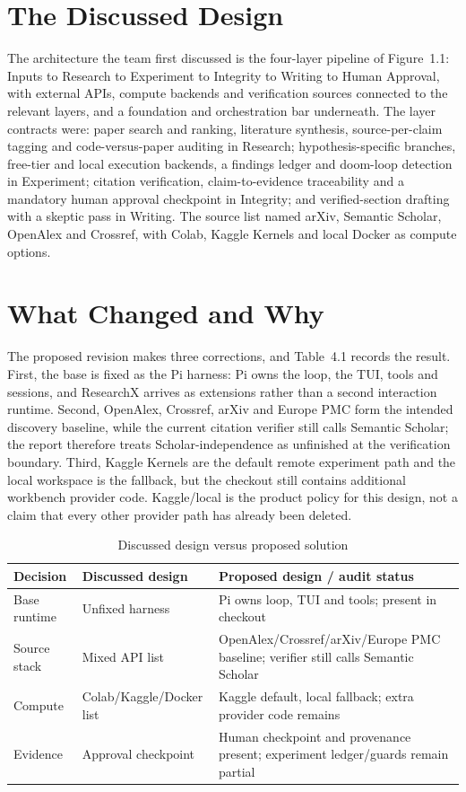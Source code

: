 \documentclass[12pt,a4paper]{report}
\numberwithin{equation}{chapter}
\begin{document}
\section{The Discussed Design}
The architecture the team first discussed is the four-layer pipeline of
Figure~1.1: Inputs to Research to Experiment to Integrity to Writing to
Human Approval, with external APIs, compute backends and verification
sources connected to the relevant layers, and a foundation and
orchestration bar underneath. The layer contracts were: paper
search and ranking, literature synthesis, source-per-claim tagging and
code-versus-paper auditing in Research; hypothesis-specific branches,
free-tier and local execution backends, a findings ledger and doom-loop
detection in Experiment; citation verification, claim-to-evidence
traceability and a mandatory human approval checkpoint in Integrity; and
verified-section drafting with a skeptic pass in Writing. The source list
named arXiv, Semantic Scholar, OpenAlex and Crossref, with Colab, Kaggle
Kernels and local Docker as compute options.

\section{What Changed and Why}
The proposed revision makes three corrections, and Table~4.1 records the
result. First, the base is fixed as the Pi harness: Pi owns the loop, the TUI,
tools and sessions, and ResearchX arrives as extensions rather than a second
interaction runtime. Second, OpenAlex, Crossref, arXiv and Europe PMC form
the intended discovery baseline, while the current citation verifier still
calls Semantic Scholar; the report therefore treats Scholar-independence as
unfinished at the verification boundary. Third, Kaggle Kernels are the default
remote experiment path and the local workspace is the fallback, but the
checkout still contains additional workbench provider code. Kaggle/local is
the product policy for this design, not a claim that every other provider path
has already been deleted.

\begin{table}[ht]
\centering
\caption{Discussed design versus proposed solution}
\begin{tabular}{@{}L{2.4cm}L{4.4cm}L{6.0cm}@{}}
\toprule
Decision & Discussed design & Proposed design / audit status \\
\midrule
Base runtime & Unfixed harness & Pi owns loop, TUI and tools; present in checkout \\
Source stack & Mixed API list & OpenAlex/Crossref/arXiv/Europe PMC baseline; verifier still calls Semantic Scholar \\
Compute & Colab/Kaggle/Docker list & Kaggle default, local fallback; extra provider code remains \\
Evidence & Approval checkpoint & Human checkpoint and provenance present; experiment ledger/guards remain partial \\
\bottomrule
\end{tabular}
\end{table}
\end{document}
